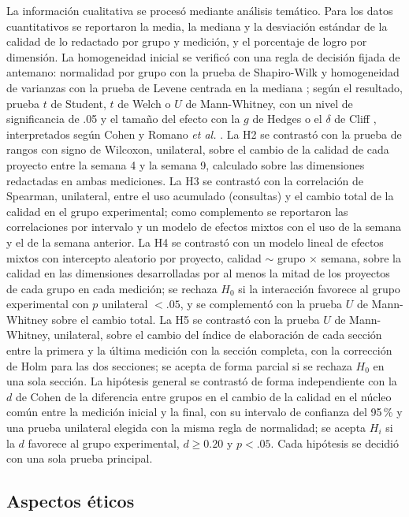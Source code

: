 \documentclass[journal]{IEEEtran}
\begin{document}
La información cualitativa se procesó mediante análisis temático. Para los datos cuantitativos se reportaron la media, la mediana y la desviación estándar de la calidad de lo redactado por grupo y medición, y el porcentaje de logro por dimensión. La homogeneidad inicial se verificó con una regla de decisión fijada de antemano: normalidad por grupo con la prueba de Shapiro-Wilk \cite{shapiro1965} y homogeneidad de varianzas con la prueba de Levene centrada en la mediana \cite{brown1974}; según el resultado, prueba $t$ de Student, $t$ de Welch o $U$ de Mann-Whitney, con un nivel de significancia de .05 y el tamaño del efecto con la $g$ de Hedges \cite{hedges1981} o el $\delta$ de Cliff \cite{cliff1993}, interpretados según Cohen \cite{cohen1988} y Romano \emph{et al.} \cite{romano2006}. La H2 se contrastó con la prueba de rangos con signo de Wilcoxon, unilateral, sobre el cambio de la calidad de cada proyecto entre la semana 4 y la semana 9, calculado sobre las dimensiones redactadas en ambas mediciones. La H3 se contrastó con la correlación de Spearman, unilateral, entre el uso acumulado (consultas) y el cambio total de la calidad en el grupo experimental; como complemento se reportaron las correlaciones por intervalo y un modelo de efectos mixtos con el uso de la semana y el de la semana anterior. La H4 se contrastó con un modelo lineal de efectos mixtos con intercepto aleatorio por proyecto, calidad $\sim$ grupo $\times$ semana, sobre la calidad en las dimensiones desarrolladas por al menos la mitad de los proyectos de cada grupo en cada medición; se rechaza $H_0$ si la interacción favorece al grupo experimental con $p$ unilateral $< .05$, y se complementó con la prueba $U$ de Mann-Whitney sobre el cambio total. La H5 se contrastó con la prueba $U$ de Mann-Whitney, unilateral, sobre el cambio del índice de elaboración de cada sección entre la primera y la última medición con la sección completa, con la corrección de Holm \cite{holm1979} para las dos secciones; se acepta de forma parcial si se rechaza $H_0$ en una sola sección. La hipótesis general se contrastó de forma independiente con la $d$ de Cohen \cite{cohen1988} de la diferencia entre grupos en el cambio de la calidad en el núcleo común entre la medición inicial y la final, con su intervalo de confianza del 95\,\% y una prueba unilateral elegida con la misma regla de normalidad; se acepta $H_i$ si la $d$ favorece al grupo experimental, $d \geq 0.20$ y $p < .05$. Cada hipótesis se decidió con una sola prueba principal.

\subsection{Aspectos éticos}
\end{document}
